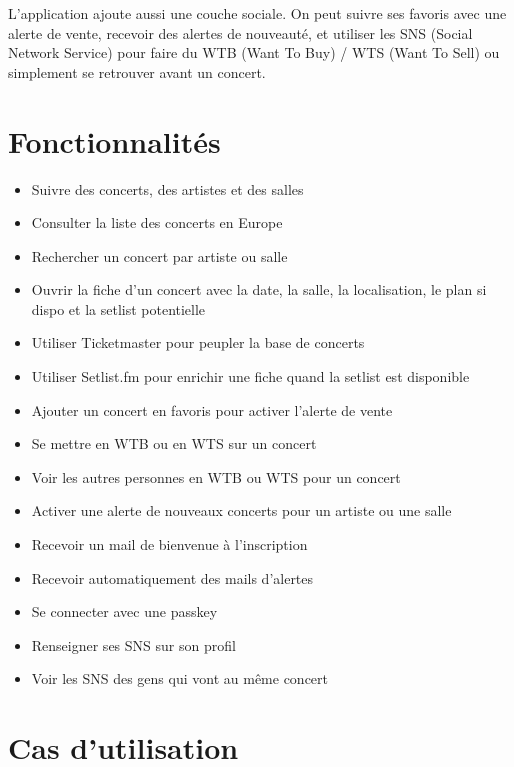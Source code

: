 \documentclass[11pt,a4paper]{article}
\begin{document}
L'application ajoute aussi une couche sociale. On peut suivre ses favoris avec une alerte de vente, recevoir des alertes de nouveauté, et utiliser les SNS (Social Network Service) pour faire du WTB (Want To Buy) / WTS (Want To Sell) ou simplement se retrouver avant un concert.

\section{Fonctionnalités}

\begin{itemize}
  \item Suivre des concerts, des artistes et des salles
  \item Consulter la liste des concerts en Europe
  \item Rechercher un concert par artiste ou salle
  \item Ouvrir la fiche d'un concert avec la date, la salle, la localisation, le plan si dispo et la setlist potentielle
  \item Utiliser Ticketmaster pour peupler la base de concerts
  \item Utiliser Setlist.fm pour enrichir une fiche quand la setlist est disponible
  \item Ajouter un concert en favoris pour activer l'alerte de vente
  \item Se mettre en WTB ou en WTS sur un concert
  \item Voir les autres personnes en WTB ou WTS pour un concert
  \item Activer une alerte de nouveaux concerts pour un artiste ou une salle
  \item Recevoir un mail de bienvenue à l'inscription
  \item Recevoir automatiquement des mails d'alertes
  \item Se connecter avec une passkey
  \item Renseigner ses SNS sur son profil
  \item Voir les SNS des gens qui vont au même concert
\end{itemize}






\section{Cas d'utilisation}
\end{document}
